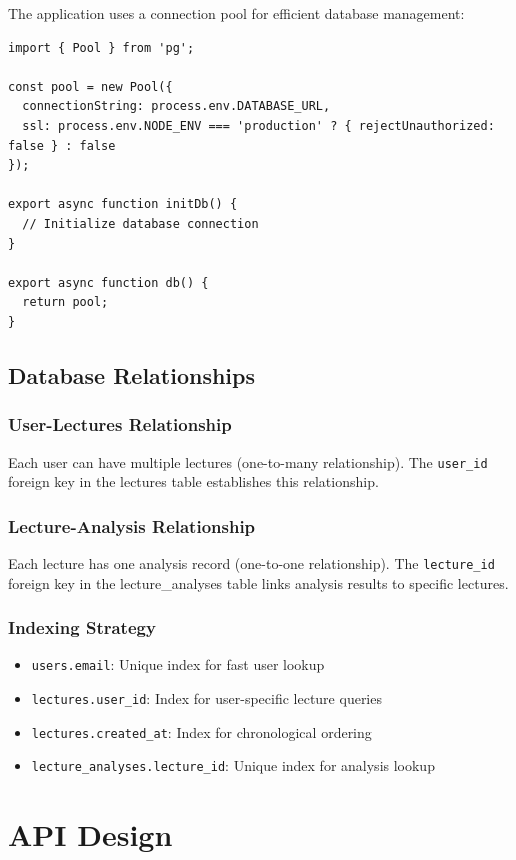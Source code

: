 \documentclass[12pt,a4paper]{article}
\newcommand{\code}[1]{\texttt{#1}}
\begin{document}
The application uses a connection pool for efficient database management:

\begin{lstlisting}[caption=Database Connection Setup]
import { Pool } from 'pg';

const pool = new Pool({
  connectionString: process.env.DATABASE_URL,
  ssl: process.env.NODE_ENV === 'production' ? { rejectUnauthorized: false } : false
});

export async function initDb() {
  // Initialize database connection
}

export async function db() {
  return pool;
}
\end{lstlisting}

\subsection{Database Relationships}

\subsubsection{User-Lectures Relationship}
Each user can have multiple lectures (one-to-many relationship). The \code{user\_id} foreign key in the lectures table establishes this relationship.

\subsubsection{Lecture-Analysis Relationship}
Each lecture has one analysis record (one-to-one relationship). The \code{lecture\_id} foreign key in the lecture\_analyses table links analysis results to specific lectures.

\subsubsection{Indexing Strategy}
\begin{itemize}
    \item \code{users.email}: Unique index for fast user lookup
    \item \code{lectures.user\_id}: Index for user-specific lecture queries
    \item \code{lectures.created\_at}: Index for chronological ordering
    \item \code{lecture\_analyses.lecture\_id}: Unique index for analysis lookup
\end{itemize}

\section{API Design}
\end{document}
